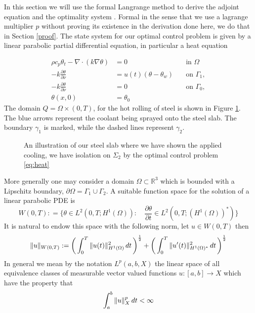 
In this section we will use the formal Langrange method to derive the adjoint equation and the optimality system \cite{optimalControl}. Formal in the sense that we use a lagrange multiplier $p$ without proving its existence in the derivation done here, we do that in Section \ref{proof}. The state system for our optimal control problem is given by a linear parabolic partial differential equation, in particular a heat equation

\begin{align*}
      \rho c_p \theta_t - \nabla \cdot (k \nabla \theta) &= 0 \quad &\text{in } \Omega \\
      -k \frac{\partial \theta}{\partial \nu} &= u(t) (\theta - \theta_w) \quad &\text{on } \Gamma_1, \\
      -k \frac{\partial \theta}{\partial \nu} &= 0 \quad &\text{on } \Gamma_0, \\
      \theta(x, 0) &= \theta_0 &
\end{align*}
The domain $Q = \Omega \times (0,T)$, for the hot rolling of steel is shown in Figure \ref{fig:steel_slab}. The blue arrows represent the coolant being sprayed onto the steel slab. The boundary $\gamma_1$ is marked, while the dashed lines represent $\gamma_2$. 
\begin{figure}
    \centering
    
    \caption{An illustration of our steel slab where we have shown the applied cooling, we have isolation on $\Sigma_2$ by the optimal control problem \eqref{eq:heat}}
    \label{fig:steel_slab}
\end{figure}

More generally one may consider a domain $\Omega \subset \mathbb{R}^3$ which is bounded with a Lipschitz boundary, $\partial \Omega = \Gamma_1 \cup \Gamma_2$. A suitable function space for the solution of a linear parabolic PDE is 
\begin{equation}
    \label{eq:funcSpace}
    W(0,T) : = \{ \theta \in L^2(0,T;H^1(\Omega)) : \quad \frac{\partial \theta}{\partial t} \in L^2(0,T;(H^1(\Omega))^{*}) \}
\end{equation}
It is natural to endow this space with the following norm, let $u \in W(0,T)$ then 
\begin{equation*}
    \|u\|_{W(0,T)} := \bigg (\int_{0}^T\|u(t)\|^2_{H^{1}(\Omega)}\mathop{dt} \bigg ) ^{\frac{1}{2}} + \bigg (\int_{0}^T\|u'(t)\|^2_{H^{1}(\Omega)^{*}}\mathop{dt} \bigg ) ^{\frac{1}{2}}
\end{equation*}
In general we mean by the notation $L^{p}(a,b,X)$ the linear space of all equivalence classes of measurable vector valued functions $u:[a,b] \rightarrow X$ which have the property that
\begin{equation*}
    \int_{a}^b\|u\|_X^p \mathop{dt}<\infty
\end{equation*}

